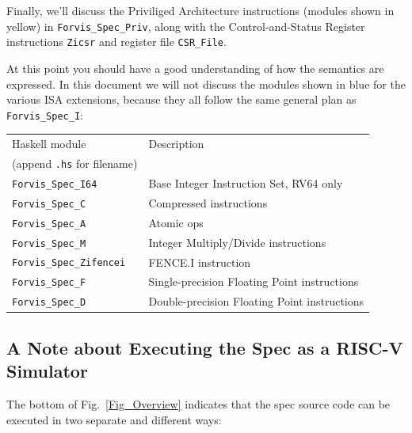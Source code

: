 \documentclass[11pt]{article}
\begin{document}
Finally, we'll discuss the Priviliged Architecture instructions
(modules shown in yellow) in \verb|Forvis_Spec_Priv|, along with the
Control-and-Status Register instructions \verb|Zicsr| and register
file \verb|CSR_File|.

At this point you should have a good understanding of how the
semantics are expressed.  In this document we will not discuss the
modules shown in blue for the various ISA extensions, because they all
follow the same general plan as \verb|Forvis_Spec_I|:

\begin{center}
\begin{tabular}{|l|l|}
\hline
Haskell module                  & Description \\
(append {\tt .hs} for filename) & \\
\hline
\hline
{\tt Forvis\_Spec\_I64}      & Base Integer Instruction Set, RV64 only \\
\hline
{\tt Forvis\_Spec\_C}        & Compressed instructions \\
\hline
{\tt Forvis\_Spec\_A}        & Atomic ops \\
\hline
{\tt Forvis\_Spec\_M}        & Integer Multiply/Divide instructions \\
\hline
{\tt Forvis\_Spec\_Zifencei} & FENCE.I instruction \\
\hline
{\tt Forvis\_Spec\_F}        & Single-precision Floating Point instructions \\
\hline
{\tt Forvis\_Spec\_D}        & Double-precision Floating Point instructions \\
\hline
\end{tabular}
\end{center}


\subsection{A Note about Executing the Spec as a RISC-V Simulator}

The bottom of Fig.~\ref{Fig_Overview} indicates that the spec source
code can be executed in two separate and different ways:
\end{document}
